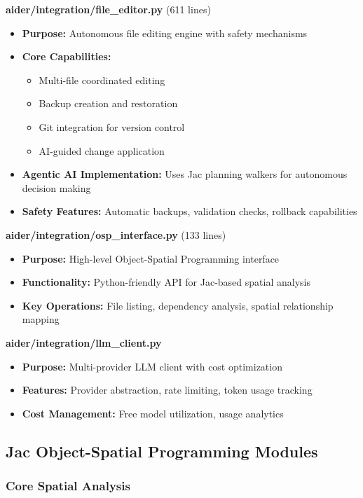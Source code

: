 \documentclass[12pt,a4paper]{article}
\begin{document}
\textbf{aider/integration/file\_editor.py} (611 lines)
\begin{itemize}
    \item \textbf{Purpose:} Autonomous file editing engine with safety mechanisms
    \item \textbf{Core Capabilities:}
    \begin{itemize}
        \item Multi-file coordinated editing
        \item Backup creation and restoration
        \item Git integration for version control
        \item AI-guided change application
    \end{itemize}
    \item \textbf{Agentic AI Implementation:} Uses Jac planning walkers for autonomous decision making
    \item \textbf{Safety Features:} Automatic backups, validation checks, rollback capabilities
\end{itemize}

\textbf{aider/integration/osp\_interface.py} (133 lines)
\begin{itemize}
    \item \textbf{Purpose:} High-level Object-Spatial Programming interface
    \item \textbf{Functionality:} Python-friendly API for Jac-based spatial analysis
    \item \textbf{Key Operations:} File listing, dependency analysis, spatial relationship mapping
\end{itemize}

\textbf{aider/integration/llm\_client.py}
\begin{itemize}
    \item \textbf{Purpose:} Multi-provider LLM client with cost optimization
    \item \textbf{Features:} Provider abstraction, rate limiting, token usage tracking
    \item \textbf{Cost Management:} Free model utilization, usage analytics
\end{itemize}

\subsection{Jac Object-Spatial Programming Modules}

\subsubsection{Core Spatial Analysis}
\end{document}
